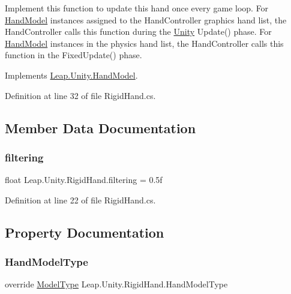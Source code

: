 Implement this function to update this hand once every game loop. For \mbox{\hyperlink{class_leap_1_1_unity_1_1_hand_model}{Hand\+Model}} instances assigned to the Hand\+Controller graphics hand list, the Hand\+Controller calls this function during the \mbox{\hyperlink{namespace_leap_1_1_unity}{Unity}} Update() phase. For \mbox{\hyperlink{class_leap_1_1_unity_1_1_hand_model}{Hand\+Model}} instances in the physics hand list, the Hand\+Controller calls this function in the Fixed\+Update() phase. 

Implements \mbox{\hyperlink{class_leap_1_1_unity_1_1_hand_model_acbb96fd18f28d01a74c1e0ac709b1977}{Leap.\+Unity.\+Hand\+Model}}.



Definition at line 32 of file Rigid\+Hand.\+cs.



\subsection{Member Data Documentation}
\mbox{\label{class_leap_1_1_unity_1_1_rigid_hand_af6249c00fe304a74ce18ed16716de07b}} 
\subsubsection{\texorpdfstring{filtering}{filtering}}
{\footnotesize\ttfamily float Leap.\+Unity.\+Rigid\+Hand.\+filtering = 0.\+5f}



Definition at line 22 of file Rigid\+Hand.\+cs.



\subsection{Property Documentation}
\mbox{\label{class_leap_1_1_unity_1_1_rigid_hand_a27e950ca795a12ee3b52dcf5de8e5032}} 
\subsubsection{\texorpdfstring{HandModelType}{HandModelType}}
{\footnotesize\ttfamily override \mbox{\hyperlink{namespace_leap_1_1_unity_a186e5eb0a2b743f1f6b79346f0ab8ad0}{Model\+Type}} Leap.\+Unity.\+Rigid\+Hand.\+Hand\+Model\+Type\hspace{0.3cm}{\ttfamily [get]}}



